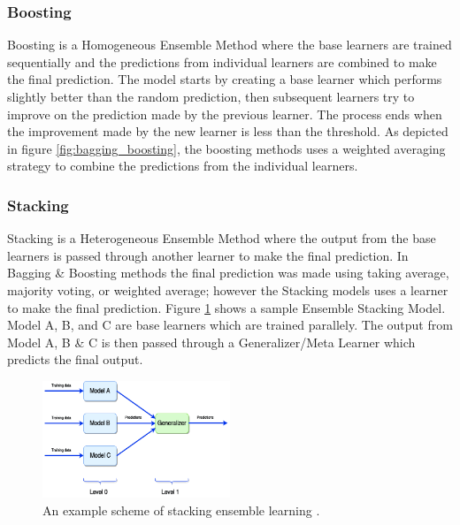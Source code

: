 \documentclass[twoside,11pt,a4paper]{article}
\begin{document}
\subsubsection{Boosting}
Boosting is a Homogeneous Ensemble Method where the base learners are trained sequentially and the predictions from individual learners are combined to make the final prediction. The model starts by creating a base learner which performs slightly better than the random prediction, then subsequent learners try to improve on the prediction made by the previous learner. The process ends when the improvement made by the new learner is less than the threshold. As depicted in figure \ref{fig:bagging_boosting}, the boosting methods uses a weighted averaging strategy to combine the predictions from the individual learners. 
\subsubsection{Stacking}
Stacking is a Heterogeneous Ensemble Method where the output from the base learners is passed through another learner to make the final prediction. In Bagging \& Boosting methods the final prediction was made using taking average, majority voting, or weighted average; however the Stacking models uses a learner to make the final prediction. Figure \ref{fig:stacking} shows a sample Ensemble Stacking Model. Model A, B, and C are base learners which are trained parallely. The output from Model A, B \& C is then passed through a Generalizer/Meta Learner which predicts the final output. 
\begin{figure}[ht]
	\centering
	\includegraphics[width=0.5\textwidth]{stacking}
	\caption[An example scheme of stacking ensemble learning. ]{An example scheme of stacking ensemble learning \cite{divina2018stacking}.}
	\label{fig:stacking}
\end{figure}
\end{document}

